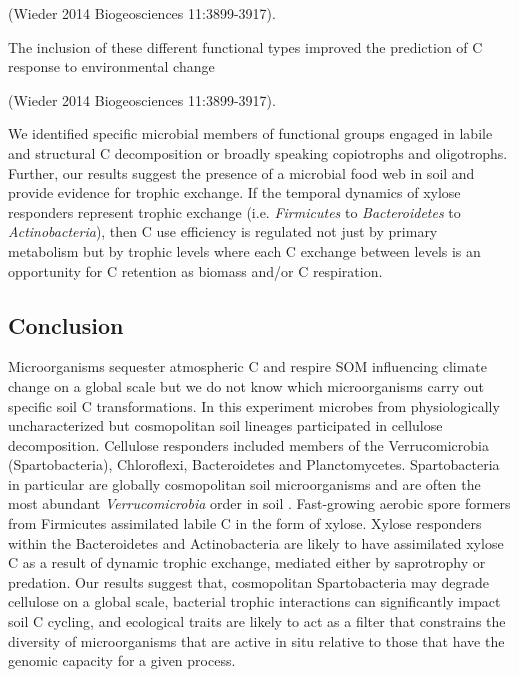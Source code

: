 (Wieder 2014 Biogeosciences 11:3899-3917). 

The inclusion of these different functional types improved the
prediction of C response to environmental change 

(Wieder 2014 Biogeosciences 11:3899-3917). 

We identified specific microbial members of functional groups engaged in labile
and structural C decomposition or broadly speaking copiotrophs and oligotrophs.
Further, our results suggest the presence of a microbial food web in soil and
provide evidence for  trophic exchange. If the temporal dynamics of xylose
responders represent trophic exchange (i.e. \textit{Firmicutes} to
\textit{Bacteroidetes} to \textit{Actinobacteria}), then C use efficiency is
regulated not just by primary metabolism but by trophic levels where each
C exchange between levels is an opportunity for C retention as biomass and/or
C respiration. 

\subsection{Conclusion} 
Microorganisms sequester atmospheric C and respire SOM influencing climate
change on a global scale but we do not know which microorganisms carry out
specific soil C transformations. In this experiment microbes from
physiologically uncharacterized but cosmopolitan soil lineages participated in
cellulose decomposition. Cellulose responders included members of the
Verrucomicrobia (Spartobacteria), Chloroflexi, Bacteroidetes and
Planctomycetes. Spartobacteria in particular are globally cosmopolitan soil
microorganisms and are often the most abundant \textit{Verrucomicrobia} order
in soil \citep{Bergmann_2011}. Fast-growing aerobic spore formers from
Firmicutes assimilated labile C in the form of xylose. Xylose responders within
the Bacteroidetes and Actinobacteria are likely to have assimilated xylose C as
a result of dynamic trophic exchange, mediated either by saprotrophy or
predation. Our results suggest that, cosmopolitan Spartobacteria may degrade
cellulose on a global scale, bacterial trophic interactions can significantly
impact soil C cycling, and ecological traits are likely to act as a filter that
constrains the diversity of microorganisms that are active in situ relative to
those that have the genomic capacity for a given process.
